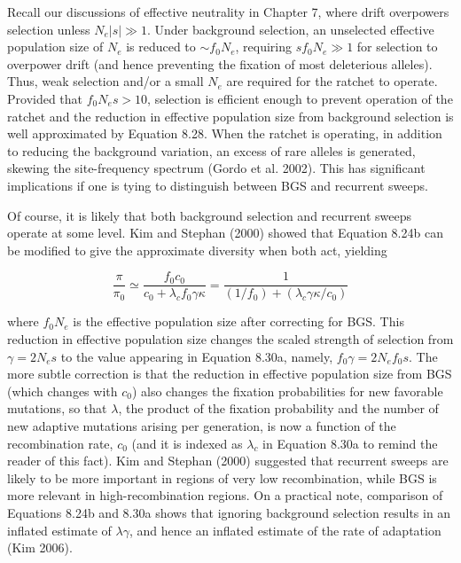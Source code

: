 \documentclass{article}
\begin{document}
Recall our discussions of effective neutrality in Chapter 7, where drift overpowers selection unless  $ N_e|s| \gg 1 $. Under background selection, an unselected effective population size of  $ N_e $ is reduced to  $ \sim f_0 N_e $, requiring  $ s f_0 N_e \gg 1 $ for selection to overpower drift (and hence preventing the fixation of most deleterious alleles). Thus, weak selection and/or a small  $ N_e $ are required for the ratchet to operate. Provided that  $ f_0 N_e s > 10 $, selection is efficient enough to prevent operation of the ratchet and the reduction in effective population size from background selection is well approximated by Equation 8.28. When the ratchet is operating, in addition to reducing the background variation, an excess of rare alleles is generated, skewing the site-frequency spectrum (Gordo et al. 2002). This has significant implications if one is tying to distinguish between BGS and recurrent sweeps.

Of course, it is likely that both background selection and recurrent sweeps operate at some level. Kim and Stephan (2000) showed that Equation 8.24b can be modified to give the approximate diversity when both act, yielding

\begin{equation}
\frac{\pi}{\pi_{0}}\simeq\frac{f_{0}c_{0}}{c_{0}+\lambda_{c}f_{0}\gamma\kappa}=\frac{1}{(1/f_{0})+(\lambda_{c}\gamma\kappa/c_{0})}
\tag{8.30a}
\label{eq:8_30a}
\end{equation}

where  $ f_{0}N_{e} $ is the effective population size after correcting for BGS. This reduction in effective population size changes the scaled strength of selection from  $ \gamma = 2N_{e}s $ to the value appearing in Equation 8.30a, namely,  $ f_{0}\gamma = 2N_{e}f_{0}s $. The more subtle correction is that the reduction in effective population size from BGS (which changes with  $ c_{0} $) also changes the fixation probabilities for new favorable mutations, so that  $ \lambda $, the product of the fixation probability and the number of new adaptive mutations arising per generation, is now a function of the recombination rate,  $ c_{0} $ (and it is indexed as  $ \lambda_{c} $ in Equation 8.30a to remind the reader of this fact). Kim and Stephan (2000) suggested that recurrent sweeps are likely to be more important in regions of very low recombination, while BGS is more relevant in high-recombination regions. On a practical note, comparison of Equations 8.24b and 8.30a shows that ignoring background selection results in an inflated estimate of  $ \lambda\gamma $, and hence an inflated estimate of the rate of adaptation (Kim 2006).
\end{document}
